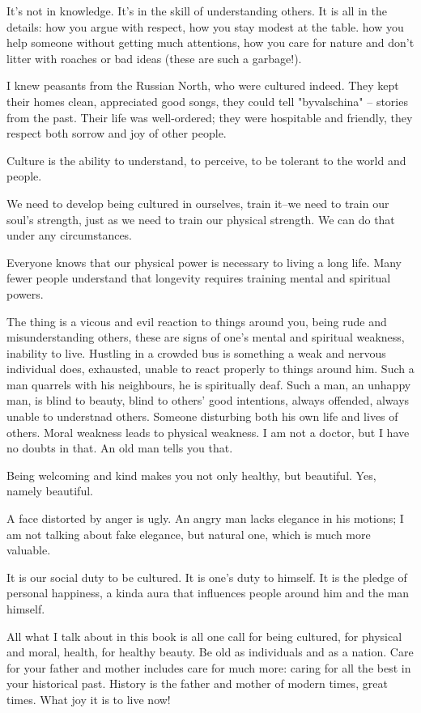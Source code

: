 It's not in knowledge. It's in the skill of understanding others. It is all in the details: how you argue with respect, how you stay modest at the table. how you help someone without getting much attentions, how you care for nature and don't litter with roaches or bad ideas (these are such a garbage!).

I knew peasants from the Russian North, who were cultured indeed. They kept their homes clean, appreciated good songs, they could tell "byvalschina" -- stories from the past. Their life was well-ordered; they were hospitable and friendly, they respect both sorrow and joy of other people.

Culture is the ability to understand, to perceive, to be tolerant to the world and people.

We need to develop being cultured in ourselves, train it--we need to train our soul's strength, just as we need to train our physical strength. We can do that under any circumstances.

Everyone knows that our physical power is necessary to living a long life. Many fewer people understand that longevity requires training mental and spiritual powers.

The thing is a vicous and evil reaction to things around you, being rude and misunderstanding others, these are signs of one's mental and spiritual weakness, inability to live. Hustling in a crowded bus is something a weak and nervous individual does, exhausted, unable to react properly to things around him. Such a man quarrels with his neighbours, he is spiritually deaf. Such a man, an unhappy man, is blind to beauty, blind to others' good intentions, always offended, always unable to understnad others. Someone disturbing both his own life and lives of others. Moral weakness leads to physical weakness. I am not a doctor, but I have no doubts in that. An old man tells you that.

Being welcoming and kind makes you not only healthy, but beautiful. Yes, namely beautiful.

A face distorted by anger is ugly. An angry man lacks elegance in his motions; I am not talking about fake elegance, but natural one, which is much more valuable.

It is our social duty to be cultured. It is one's duty to himself. It is the pledge of personal happiness, a kinda aura that influences people around him and the man himself.

All what I talk about in this book is all one call for being cultured, for physical and moral, health, for healthy beauty. Be old as individuals and as a nation. Care for your father and mother includes care for much more: caring for all the best in your historical past. History is the father and mother of modern times, great times. What joy it is to live now!